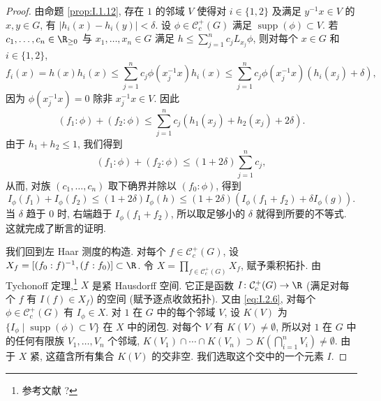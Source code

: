 \begin{proof}
由命题 \ref{prop:I.1.12}, 存在 $1$ 的邻域 $V$ 使得对 $i \in \{1, 2\}$ 及满足 $y^{-1}x \in V$ 的 $x, y \in G$, 有 $|h_i(x) - h_i(y)| < \delta$. 设 $\phi \in \mathcal{C}_c^+(G)$ 满足 $\operatorname{supp}(\phi) \subset V$. 若 $c_1, \ldots, c_n \in \R_{\geq 0}$ 与 $x_1, \ldots, x_n \in G$ 满足 $h \leq \sum_{j=1}^n c_jL_{x_j}\phi$, 则对每个 $x \in G$ 和 $i \in \{1, 2\}$,
\[
f_i(x) = h(x)h_i(x) \leq \sum_{j=1}^n c_j\phi(x_j^{-1}x)h_i(x) \leq \sum_{j=1}^n c_j\phi(x_j^{-1}x)(h_i(x_j) + \delta),
\]
因为 $\phi(x_j^{-1}x) = 0$ 除非 $x_j^{-1}x \in V$. 因此
\[
(f_1 : \phi) + (f_2 : \phi) \leq \sum_{j=1}^n c_j(h_1(x_j) + h_2(x_j) + 2\delta).
\]
由于 $h_1 + h_2 \leq 1$, 我们得到
\[
(f_1 : \phi) + (f_2 : \phi) \leq (1 + 2\delta)\sum_{j=1}^n c_j,
\]
从而, 对族 $(c_1, \ldots, c_n)$ 取下确界并除以 $(f_0 : \phi)$, 得到
\[
I_{\phi}(f_1) + I_{\phi}(f_2) \leq (1 + 2\delta)I_{\phi}(h) \leq (1 + 2\delta)(I_{\phi}(f_1 + f_2) + \delta I_{\phi}(g)).
\]
当 $\delta$ 趋于 $0$ 时, 右端趋于 $I_{\phi}(f_1 + f_2)$, 所以取足够小的 $\delta$ 就得到所要的不等式. 这就完成了断言的证明.

我们回到左 Haar 测度的构造. 对每个 $f \in \mathcal{C}_c^+(G)$, 设 $X_f = [(f_0 : f)^{-1}, (f : f_0)] \subset \R$. 令 $X = \prod_{f \in \mathcal{C}_c^+(G)} X_f$, 赋予乘积拓扑. 由 Tychonoff 定理,\footnote{参考文献 ?} $X$ 是紧 Hausdorff 空间. 它正是函数 $I \colon \mathcal{C}_c^+(G) \to \R$ (满足对每个 $f$ 有 $I(f) \in X_f$) 的空间 (赋予逐点收敛拓扑). 又由 \eqref{eq:I.2.6}, 对每个 $\phi \in \mathcal{C}_c^+(G)$ 有 $I_{\phi} \in X$. 对 $1$ 在 $G$ 中的每个邻域 $V$, 设 $K(V)$ 为 $\{I_{\phi} \mid \operatorname{supp}(\phi) \subset V\}$ 在 $X$ 中的闭包. 对每个 $V$ 有 $K(V) \neq \emptyset$, 所以对 $1$ 在 $G$ 中的任何有限族 $V_1, \ldots, V_n$ 个邻域, $K(V_1) \cap \cdots \cap K(V_n) \supset K(\bigcap_{i=1}^n V_i) \neq \emptyset$. 由于 $X$ 紧, 这蕴含所有集合 $K(V)$ 的交非空. 我们选取这个交中的一个元素 $I$.


\end{proof}
